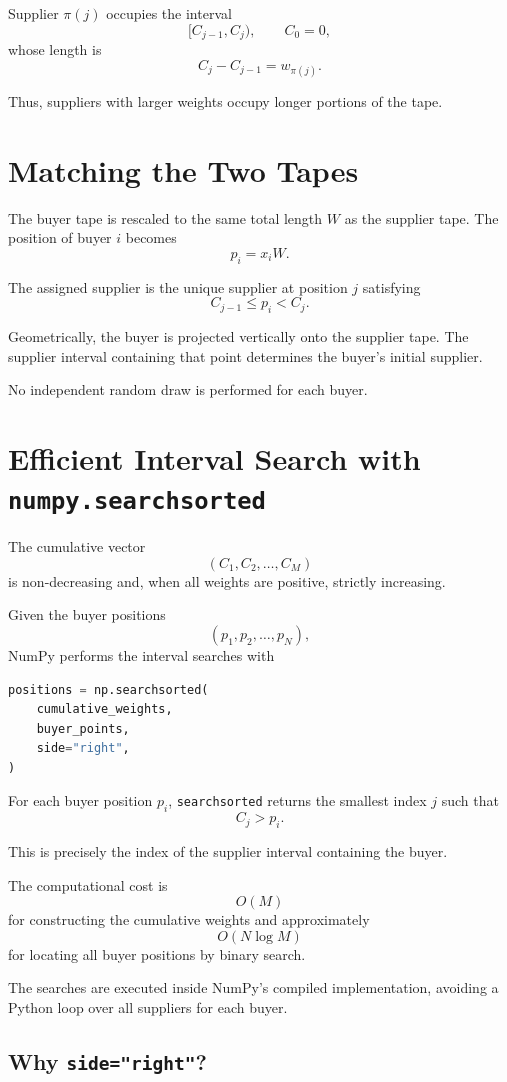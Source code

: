 \documentclass[11pt,a4paper]{article}
\begin{document}
Supplier \(\pi(j)\) occupies the interval
\[
[C_{j-1},C_j),
\qquad C_0=0,
\]
whose length is
\[
C_j-C_{j-1}=w_{\pi(j)}.
\]

Thus, suppliers with larger weights occupy longer portions of the tape.

\section{Matching the Two Tapes}

The buyer tape is rescaled to the same total length \(W\) as the supplier
tape. The position of buyer \(i\) becomes
\[
p_i=x_iW.
\]

The assigned supplier is the unique supplier at position \(j\) satisfying
\[
C_{j-1}\leq p_i<C_j.
\]

Geometrically, the buyer is projected vertically onto the supplier tape.
The supplier interval containing that point determines the buyer's initial
supplier.

No independent random draw is performed for each buyer.

\section{Efficient Interval Search with \texttt{numpy.searchsorted}}

The cumulative vector
\[
(C_1,C_2,\ldots,C_M)
\]
is non-decreasing and, when all weights are positive, strictly increasing.

Given the buyer positions
\[
(p_1,p_2,\ldots,p_N),
\]
NumPy performs the interval searches with

\begin{lstlisting}[language=Python]
positions = np.searchsorted(
    cumulative_weights,
    buyer_points,
    side="right",
)
\end{lstlisting}

For each buyer position \(p_i\), \texttt{searchsorted} returns the smallest
index \(j\) such that
\[
C_j>p_i.
\]

This is precisely the index of the supplier interval containing the buyer.

The computational cost is
\[
O(M)
\]
for constructing the cumulative weights and approximately
\[
O(N\log M)
\]
for locating all buyer positions by binary search.

The searches are executed inside NumPy's compiled implementation, avoiding
a Python loop over all suppliers for each buyer.

\subsection{Why \texttt{side="right"}?}
\end{document}
